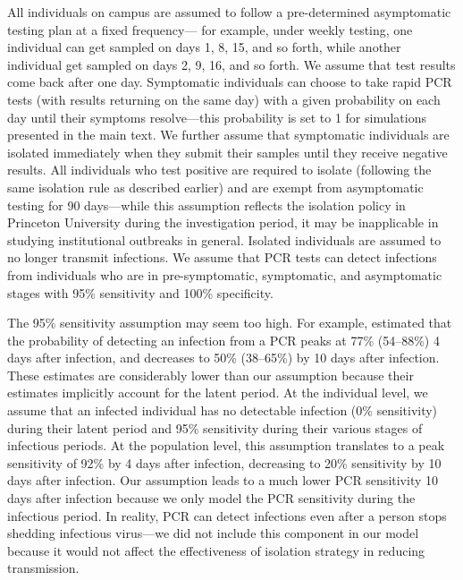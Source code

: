 \documentclass[12pt]{article}
\begin{document}
All individuals on campus are assumed to follow a pre-determined asymptomatic testing plan at a fixed frequency---
for example, under weekly testing, one individual can get sampled on days 1, 8, 15, and so forth, while another individual get sampled on days 2, 9, 16, and so forth.
We assume that test results come back after one day.
Symptomatic individuals can choose to take rapid PCR tests (with results returning on the same day) with a given probability on each day until their symptoms resolve---this probability is set to 1 for simulations presented in the main text.
We further assume that symptomatic individuals are isolated immediately when they submit their samples until they receive negative results.
All individuals who test positive are required to isolate (following the same isolation rule as described earlier) and are exempt from asymptomatic testing for 90 days---while this assumption reflects the isolation policy in Princeton University during the investigation period, it may be inapplicable in studying institutional outbreaks in general.
Isolated individuals are assumed to no longer transmit infections.
We assume that PCR tests can detect infections from individuals who are in pre-symptomatic, symptomatic, and asymptomatic stages with 95\% sensitivity and 100\% specificity.

The 95\% sensitivity assumption may seem too high. 
For example, \cite{hellewell2021estimating} estimated that the probability of detecting an infection from a PCR peaks at 77\% (54–88\%) 4 days after infection, and decreases to 50\% (38–65\%) by 10 days after infection.
These estimates are considerably lower than our assumption because their estimates implicitly account for the latent period.
At the individual level, we assume that an infected individual has no detectable infection (0\% sensitivity) during their latent period and 95\% sensitivity during their various stages of infectious periods.
At the population level, this assumption translates to a peak sensitivity of 92\% by 4 days after infection, decreasing to 20\% sensitivity by 10 days after infection.
Our assumption leads to a much lower PCR sensitivity 10 days after infection because we only model the PCR sensitivity during the infectious period.
In reality, PCR can detect infections even after a person stops shedding infectious virus---we did not include this component in our model because it would not affect the effectiveness of isolation strategy in reducing transmission.
\end{document}

